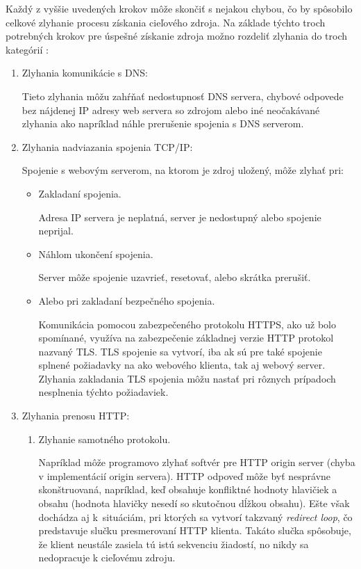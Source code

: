 Každý z vyššie uvedených krokov môže skončiť s nejakou chybou, čo by spôsobilo celkové zlyhanie procesu získania cieľového zdroja.
Na základe týchto troch potrebných krokov pre úspešné získanie zdroja možno rozdeliť zlyhania do troch kategórií \cite{nel-client-side-measurement-e2e-reliability, W3C-NEL}:
\begin{enumerate}
    \item Zlyhania komunikácie s DNS:

    Tieto zlyhania môžu zahŕňať nedostupnosť DNS servera, chybové odpovede bez nájdenej 
    IP adresy web servera so zdrojom alebo iné neočakávané zlyhania ako napríklad náhle prerušenie spojenia s DNS serverom.
    
    \item Zlyhania nadviazania spojenia TCP/IP:

    Spojenie s webovým serverom, na ktorom je zdroj uložený, môže zlyhať pri:
    \begin{itemize}
        \item Zakladaní spojenia.
        
        Adresa IP servera je neplatná, server je nedostupný alebo spojenie neprijal.
        
        \item Náhlom ukončení spojenia.

        Server môže spojenie uzavrieť, resetovať, alebo skrátka prerušiť.  

        \item Alebo pri zakladaní bezpečného spojenia.

        Komunikácia pomocou zabezpečeného protokolu HTTPS, ako už bolo spomínané, využíva na zabezpečenie základnej verzie HTTP protokol nazvaný TLS.
        TLS spojenie sa vytvorí, iba ak sú pre také spojenie splnené požiadavky na ako webového klienta, tak aj webový server. 
        Zlyhania zakladania TLS spojenia môžu nastať pri rôznych prípadoch nesplnenia týchto požiadaviek.

    \end{itemize}
    
    \item Zlyhania prenosu HTTP:

    \begin{enumerate}
        \item Zlyhanie samotného protokolu.

        Napríklad môže programovo zlyhať softvér pre HTTP origin server (chyba v implementácií origin servera).
        HTTP odpoveď môže byť nesprávne skonštruovaná, napríklad, keď obsahuje konfliktné hodnoty hlavičiek a obsahu (hodnota hlavičky  nesedí so skutočnou dĺžkou obsahu).  
        Ešte však dochádza aj \mbox{k situáciám}, pri ktorých sa vytvorí takzvaný \textit{redirect loop}, čo predstavuje slučku presmerovaní HTTP klienta. Takáto slučka spôsobuje, že klient neustále zasiela tú istú sekvenciu žiadostí, no nikdy sa nedopracuje k cieľovému zdroju.
        

\end{enumerate}
\end{enumerate}
